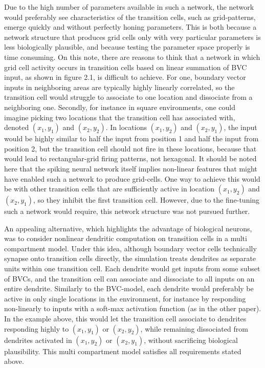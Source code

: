 \documentclass{article}
\begin{document}
    Due to the high number of parameters available in such a network, the network would preferably see characteristics of the transition cells, such as grid-patterns, emerge quickly and without perfectly honing parameters.
    This is both because a network structure that produces grid cells only with very particular parameters is less biologically plausible, and because testing the parameter space properly is time consuming. On this note, there are reasons to think that a network in which grid cell activity occurs in transition cells based on linear summation of BVC input, as shown in figure 2.1, is difficult to achieve. For one, boundary vector inputs in neighboring areas are typically highly linearly correlated, so the transition cell would struggle to associate to one location and dissociate from a neighboring one. Secondly, for instance in square environments, one could imagine picking two locations that the transition cell has associated with, denoted \((x_1, y_1)\) and \((x_2, y_2)\). In locations \((x_1, y_2)\) and \((x_2, y_1)\), the input would be highly similar to half the input from position 1 and half the input from position 2, but the transition cell should not fire in these locations, because that would lead to rectangular-grid firing patterns, not hexagonal. It should be noted here that the spiking neural network itself implies non-linear features that might have enabled such a network to produce grid-cells. One way to achieve this would be with other transition cells that are sufficiently active in location \((x_1, y_2)\) and \((x_2, y_1)\), so they inhibit the first transition cell. However, due to the fine-tuning such a network would require, this network structure was not pursued further.

    An appealing alternative, which highlights the advantage of biological neurons, was to consider nonlinear dendritic computation on transition cells in a multi compartment model. Under this idea, although boundary vector cells technically synapse onto transition cells directly, the simulation treats dendrites as separate units within one transition cell. Each dendrite would get inputs from some subset of BVCs, and the transition cell can associate and dissociate to all inputs on an entire dendrite. Similarly to the BVC-model, each dendrite would preferably be active in only single locations in the environment, for instance by responding non-linearly to inputs with a soft-max activation function (as in the other paper). In the example above, this would let the transition cell associate to dendrites responding highly to \((x_1, y_1)\) or \((x_2, y_2)\), while remaining dissociated from dendrites activated in \((x_1, y_2)\) or \((x_2, y_1)\), without sacrificing biological plausibility. This multi compartment model satisfies all requirements stated above. 
\end{document}
